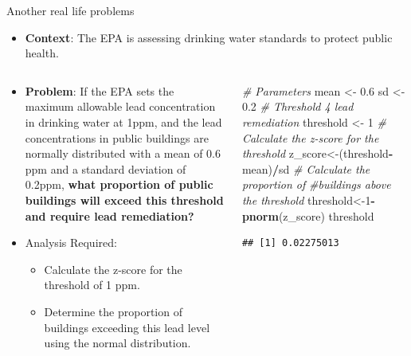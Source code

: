 \documentclass[
  ignorenonframetext,
]{beamer}
\newenvironment{Shaded}{\begin{snugshade}}{\end{snugshade}}
\newcommand{\CommentTok}[1]{\textcolor[rgb]{0.56,0.35,0.01}{\textit{#1}}}
\newcommand{\DecValTok}[1]{\textcolor[rgb]{0.00,0.00,0.81}{#1}}
\newcommand{\FloatTok}[1]{\textcolor[rgb]{0.00,0.00,0.81}{#1}}
\newcommand{\FunctionTok}[1]{\textcolor[rgb]{0.13,0.29,0.53}{\textbf{#1}}}
\newcommand{\NormalTok}[1]{#1}
\newcommand{\OtherTok}[1]{\textcolor[rgb]{0.56,0.35,0.01}{#1}}
\newcommand{\SpecialCharTok}[1]{\textcolor[rgb]{0.81,0.36,0.00}{\textbf{#1}}}
\providecommand{\tightlist}{%
  \setlength{\itemsep}{0pt}\setlength{\parskip}{0pt}}
\begin{document}
\begin{frame}[fragile]{Another real life problems}
\label{another-real-life-problems}
\begin{itemize}
\tightlist
\item
  \textbf{Context}: The EPA is assessing drinking water standards to
  protect public health.
\end{itemize}

\begin{columns}[T]
\begin{column}{0.5\textwidth}
\begin{itemize}
\item
  \textbf{Problem}: If the EPA sets the maximum allowable lead
  concentration in drinking water at 1ppm, and the lead concentrations
  in public buildings are normally distributed with a mean of 0.6 ppm
  and a standard deviation of 0.2ppm, \textbf{what proportion of public
  buildings will exceed this threshold and require lead remediation?}
\item
  Analysis Required:

  \begin{itemize}
  \tightlist
  \item
    Calculate the z-score for the threshold of 1 ppm.
  \item
    Determine the proportion of buildings exceeding this lead level
    using the normal distribution. \vspace{1cm}
  \end{itemize}
\end{itemize}
\end{column}

\begin{column}{0.5\textwidth}
\vspace{1cm}

\begin{Shaded}
\begin{Highlighting}[]
\CommentTok{\# Parameters}
\NormalTok{mean }\OtherTok{\textless{}{-}} \FloatTok{0.6}
\NormalTok{sd }\OtherTok{\textless{}{-}} \FloatTok{0.2}
\CommentTok{\# Threshold 4 lead remediation}
\NormalTok{threshold }\OtherTok{\textless{}{-}} \DecValTok{1}
\CommentTok{\# Calculate the z{-}score for the threshold}
\NormalTok{z\_score}\OtherTok{\textless{}{-}}\NormalTok{(threshold}\SpecialCharTok{{-}}\NormalTok{mean)}\SpecialCharTok{/}\NormalTok{sd}
\CommentTok{\# Calculate the proportion of }
\CommentTok{\#buildings above the threshold}
\NormalTok{threshold}\OtherTok{\textless{}{-}}\DecValTok{1}\SpecialCharTok{{-}}\FunctionTok{pnorm}\NormalTok{(z\_score)}
\NormalTok{threshold}
\end{Highlighting}
\end{Shaded}

\begin{verbatim}
## [1] 0.02275013
\end{verbatim}
\end{column}
\end{columns}
\end{frame}
\end{document}
